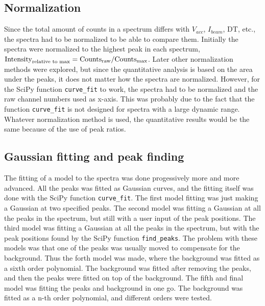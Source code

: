 \subsection{Normalization}
\label{sec:method:treatment:normalization}
Since the total amount of counts in a spectrum differs with $V_{acc}$, $I_{beam}$, DT, etc., the spectra had to be normalized to be able to compare them.
Initially the spectra were normalized to the highest peak in each spectrum, $\textnormal{Intensity}_{\textnormal{relative to max}} = \textnormal{Counts}_{\textnormal{raw}} / \textnormal{Counts}_{\textnormal{max}}$.
Later other normalization methods were explored, but since the quantitative analysis is based on the area under the peaks, it does not matter how the spectra are normalized.
However, for the SciPy function \verb|curve_fit| to work, the spectra had to be normalized and the raw channel numbers used as x-axis.
This was probably due to the fact that the function \verb|curve_fit| is not designed for spectra with a large dynamic range.
Whatever normalization method is used, the quantitative results would be the same because of the use of peak ratios.

\subsection{Gaussian fitting and peak finding}
\label{sec:method:treatment:fitting}
The fitting of a model to the spectra was done progessively more and more advanced.
All the peaks was fitted as Gaussian curves, and the fitting itself was done with the SciPy function \verb|curve_fit|.
The first model fitting was just making a Gaussian at two specified peaks.
The second model was fitting a Gaussian at all the peaks in the spectrum, but still with a user input of the peak positions.
The third model was fitting a Gaussian at all the peaks in the spectrum, but with the peak positions found by the SciPy function \verb|find_peaks|.
The problem with these models was that one of the peaks was usually moved to compensate for the background.
Thus the forth model was made, where the background was fitted as a sixth order polynomial.
The background was fitted after removing the peaks, and then the peaks were fitted on top of the background.
The fifth and final model was fitting the peaks and background in one go.
The background was fitted as a n-th order polynomial, and different orders were tested.



